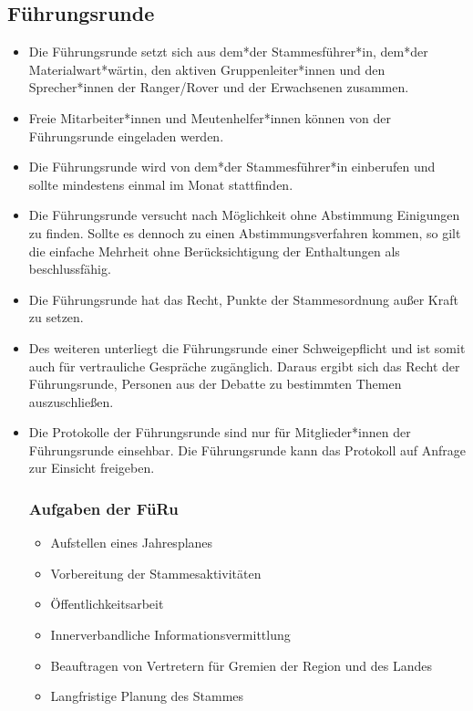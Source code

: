 \documentclass[a4paper]{article}
\begin{document}
    \subsection{Führungsrunde}
	\begin{itemize}
		\item Die Führungsrunde setzt sich aus dem*der Stammesführer*in, dem*der Materialwart*wärtin, den aktiven Gruppenleiter*innen und den Sprecher*innen der Ranger/Rover und der Erwachsenen zusammen. 
		\item Freie Mitarbeiter*innen und Meutenhelfer*innen können von der Führungsrunde eingeladen werden. 
		\item Die Führungsrunde wird von dem*der Stammesführer*in einberufen und sollte mindestens einmal im Monat stattfinden. 
		\item Die Führungsrunde versucht nach Möglichkeit ohne Abstimmung Einigungen zu finden. Sollte es dennoch zu einen Abstimmungsverfahren kommen, so gilt die einfache Mehrheit ohne Berücksichtigung der Enthaltungen als beschlussfähig. 
		\item Die Führungsrunde hat das Recht, Punkte der Stammesordnung außer Kraft zu setzen. 
		\item Des weiteren unterliegt die Führungsrunde einer Schweigepflicht und ist somit auch für vertrauliche Gespräche zugänglich. Daraus ergibt sich das Recht der Führungsrunde, Personen aus der Debatte zu bestimmten Themen auszuschließen. 
		\item Die Protokolle der Führungsrunde sind nur für Mitglieder*innen der Führungsrunde einsehbar. Die Führungsrunde kann das Protokoll auf Anfrage zur Einsicht freigeben.
		\subsubsection{Aufgaben der FüRu} 
		\begin{itemize}
		    \item Aufstellen eines Jahresplanes 
			\item Vorbereitung der Stammesaktivitäten 
			\item Öffentlichkeitsarbeit 
			\item Innerverbandliche Informationsvermittlung 
			\item Beauftragen von Vertretern für Gremien der Region und des Landes 
            \item Langfristige Planung des Stammes
		\end{itemize}
	\end{itemize}
    
\end{document}
